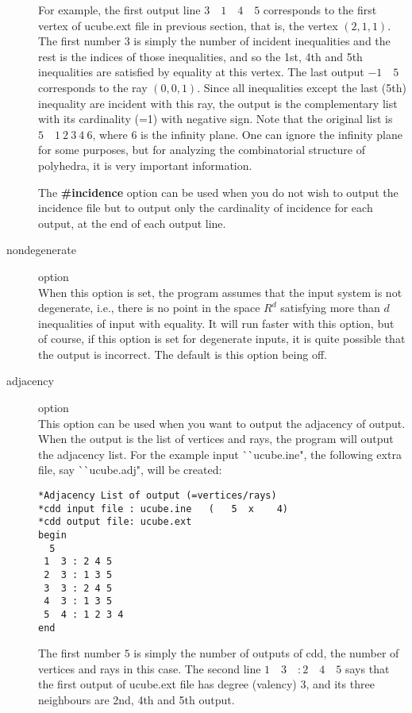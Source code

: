 \begin{description}
For example, the first output line $3 \quad 1 \quad 4 \quad 5$ 
corresponds to the
first vertex of ucube.ext file in previous section, that is, 
the vertex $(2, 1, 1)$.  The first number $3$ is simply the number
of incident inequalities and the rest is the indices of
those inequalities, and so the 1st, 4th and 5th inequalities are
satisfied by equality at this vertex.   The last output
$-1 \quad 5$ corresponds to the ray  $(0,0,1)$.  Since all inequalities
except the last (5th) inequality are incident with this ray,
the output is the complementary list with its cardinality (=1) with negative
sign.  Note that the original list is $5 \quad 1 \: 2 \: 3 \: 4 \: 6$, where
$6$ is the infinity plane.  One can ignore the infinity
plane for some purposes,  but for analyzing the combinatorial 
structure of polyhedra, it is
very important information.

The {\bf \#incidence} option can be used when you do not wish
to output the incidence file but to output only the cardinality of incidence
for each output, at the end of each output line.


\item[nondegenerate] option\\
When this option is set, the program assumes that the input system
is not degenerate, i.e., there is no point in the space $R^d$ satisfying
more than $d$ inequalities of input with equality.
It will run faster with this option, but of course, 
if this option is set for degenerate inputs, it is 
quite possible that the output is incorrect.  
The default is this option being off.

\item[adjacency] option\\
This option can be used when you want to output the adjacency of output.
When the output is the list of vertices and rays, the program will
output the adjacency list.  For the example input ^^ ^^ ucube.ine",
the following extra file, say ^^ ^^ ucube.adj", will be created:
\begin{verbatim}
*Adjacency List of output (=vertices/rays)
*cdd input file : ucube.ine   (   5  x    4)
*cdd output file: ucube.ext
begin
  5
 1  3 : 2 4 5
 2  3 : 1 3 5
 3  3 : 2 4 5
 4  3 : 1 3 5
 5  4 : 1 2 3 4
end
\end{verbatim}
The first number $5$ is simply the number of outputs of cdd, the
number of vertices and rays in this case.
The second line $ 1 \quad  3 \quad : 2 \quad  4 \quad  5$ says 
that the first output of
ucube.ext file has degree (valency) $3$, and its three neighbours are
2nd, 4th and 5th output.


\end{description}

